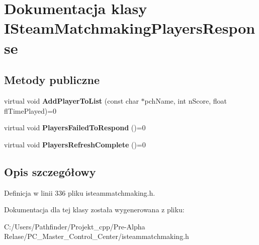 \hypertarget{class_i_steam_matchmaking_players_response}{}\section{Dokumentacja klasy I\+Steam\+Matchmaking\+Players\+Response}
\label{class_i_steam_matchmaking_players_response}
\subsection*{Metody publiczne}
\begin{DoxyCompactItemize}
\item 
\mbox{\label{class_i_steam_matchmaking_players_response_ab7b31c0c6c0cd9ec40cb58272791c13f}} 
virtual void {\bfseries Add\+Player\+To\+List} (const char $\ast$pch\+Name, int n\+Score, float fl\+Time\+Played)=0
\item 
\mbox{\label{class_i_steam_matchmaking_players_response_ab555af586e505182888b64fac9a11e66}} 
virtual void {\bfseries Players\+Failed\+To\+Respond} ()=0
\item 
\mbox{\label{class_i_steam_matchmaking_players_response_aa8382d0a999db8148929e43b564ece02}} 
virtual void {\bfseries Players\+Refresh\+Complete} ()=0
\end{DoxyCompactItemize}


\subsection{Opis szczegółowy}


Definicja w linii 336 pliku isteammatchmaking.\+h.



Dokumentacja dla tej klasy została wygenerowana z pliku\+:\begin{DoxyCompactItemize}
\item 
C\+:/\+Users/\+Pathfinder/\+Projekt\+\_\+cpp/\+Pre-\/\+Alpha Relase/\+P\+C\+\_\+\+Master\+\_\+\+Control\+\_\+\+Center/isteammatchmaking.\+h\end{DoxyCompactItemize}
